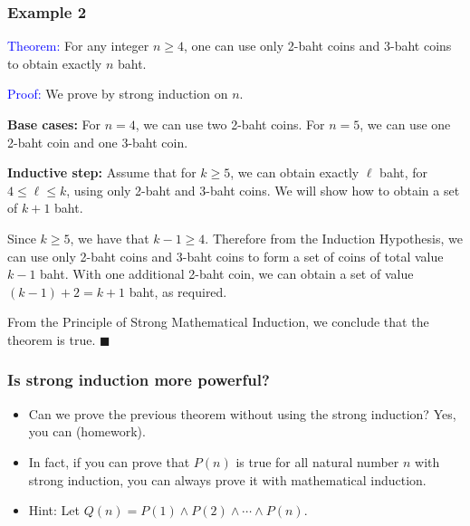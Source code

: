 \begin{frame}\frametitle{Example 2}
  \textcolor{blue}{Theorem:} For any integer $n\geq 4$, one can use only
  2-baht coins and 3-baht coins to obtain exactly $n$ baht.
  \vspace{0.1in}

  \textcolor{blue}{Proof:} We prove by strong induction on $n$.
  \pause
  
  {\bf Base cases:} For $n=4$, we can use two 2-baht coins.  For
  $n=5$, we can use one 2-baht coin and one 3-baht coin.
  \pause
  \vspace{0.125in}

  {\bf Inductive step:} Assume that for $k\geq 5$, we can obtain
  exactly $\ell$ baht, for $4\leq\ell\leq k$, using only 2-baht and
  3-baht coins.  We will show how to obtain a set of $k+1$ baht.
  \pause
  
  Since $k\geq 5$, we have that $k-1 \geq 4$.  Therefore from the
  Induction Hypothesis, we can use only 2-baht coins and 3-baht coins
  to form a set of coins of total value $k-1$ baht.  \pause With one
  additional 2-baht coin, we can obtain a set of value $(k-1) + 2 =
  k+1$ baht, as required.  \pause
  \vspace{0.125in}

  From the Principle of Strong Mathematical Induction, we conclude
  that the theorem is true. $\blacksquare$
\end{frame}

\begin{frame}\frametitle{Is strong induction more powerful?}
  \begin{itemize}
  \item Can we prove the previous theorem without using the strong
    induction?
    \pause Yes, you can (homework). \pause
  \item In fact, if you can prove that $P(n)$ is true for all natural
    number $n$ with strong induction, you can always prove it with
    mathematical induction.
    \pause
  \item Hint: Let $Q(n)=P(1)\wedge P(2)\wedge\cdots\wedge P(n)$.
  \end{itemize}
\end{frame}
